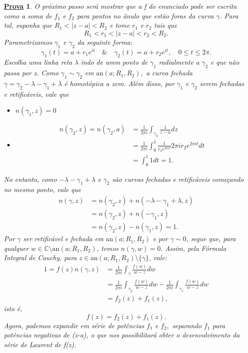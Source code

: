 \documentclass{article}
\newtheorem*{proof*}{\underline{Prova}}
\begin{document}
\begin{proof*}
    O próximo passo será mostrar que a f do enunciado pode ser escrita como a soma de \(f_{1}\) e \(f_{2}\) para pontos no ânulo que estão
    foras da curva \(\gamma \). Para tal, suponha que \(R_{1} < |z-a| < R_{2}\) e tome \(r_1\) e \(r_{2}\) tais que 
    \[
      R_{1} < r_{1} < |z-a| < r_{2} < R_{2}.
    \]
    Parametrizamos \(\gamma_{1}\) e \(\gamma_{2}\) da seguinte forma:
    \[
      \gamma _{1}(t) = a + r_{1}e^{it}\quad\&\quad \gamma_{2}(t) = a + r_{2}e^{it},\quad 0\leq t\leq 2\pi .
    \]
    Escolha uma linha reta \(\lambda \) indo de umm ponto de \(\gamma_{1}\) radialmente a \(\gamma _{2}\) e que não passa por z.
    Como \(\gamma _{1}\sim \gamma _{2}\) em \(\mathrm{an}(a; R_{1}, R_{2}),\) a curva fechada \(\gamma  = \gamma_{2} - \lambda -\gamma _{1} + \lambda \) é homotópica
    a zero. Além disso, por \(\gamma _{1}\) e \(\gamma _{2}\) serem fechadas e retificáveis, vale que 
    \begin{itemize}
      \item[a)] \(n(\gamma_{1}, z) = 0\)
      \item[b)] 
        \begin{align*}
          n(\gamma_{2}, z) = n(\gamma_{2}, a) &= \frac{1}{2\pi i}\int_{\gamma_{2}}^{}\frac{1}{z-a}dz\\
                                              &= \frac{1}{2\pi i}\int_{0}^{1}\frac{1}{r_{2}e^{2\pi it}}2\pi ir_{2}e^{2\pi it }dt\\
                                              &= \int_{0}^{1}1dt = 1.
        \end{align*}
    \end{itemize}
    No entanto, como \(-\lambda -\gamma _{1}+\lambda \) e \(\gamma _{2}\) são curvas fechadas e retificáveis começando no mesmo ponto,
    vale que 
    \begin{align*}
      n(\gamma , z) &= n(\gamma_{2}, z) + n (-\lambda -\gamma _{1} + \lambda , z)\\
                    &= n(\gamma_{2}, z) + n(-\gamma_{1}, z)\\
                    &= n(\gamma_{2}, z) - n(\gamma_{1}, z) = 1.
    \end{align*}
    Por \(\gamma \) ser retificável e fechada em \(\mathrm{an}(a; R_{1}, R_{2})\) e por \(\gamma \sim 0\), segue que, para
    qualquer \(w\in \mathbb{C}\setminus{\mathrm{an}(a; R_{1}, R_{2})}\), temos \(n(\gamma, w) = 0.\) Assim, pela Fórmula Integral de Cauchy,
    para \(z\in \mathrm{an}(a; R_{1}, R_{2})\setminus{\{\gamma \}}\), vale:
    \begin{align*}
      1 = f(z)n(\gamma , z) &= \frac{1}{2\pi i}\int_{\gamma }^{}\frac{f(w)}{w-z}dw\\
                            &= \frac{1}{2\pi i}\int_{\gamma _{2}}^{}\frac{f(w)}{w-z}dw - \frac{1}{2\pi i}\int_{\gamma _{1}}^{}\frac{f(w)}{w-z}dw\\
                            &= f_{2}(z) + f_{1}(z),
    \end{align*}
    isto é, 
    \[
      f(z) = f_{2}(z) + f_{1}(z).
    \]
    Agora, podemos expandir em série de potências \(f_{1}\) e \(f_{2},\) separando \(f_{1}\) para potências negativas de (z-a), o que nos possibilitará obter
    o desenvolvimento da série de Laurent de f(z).


\end{proof*}
\end{document}
